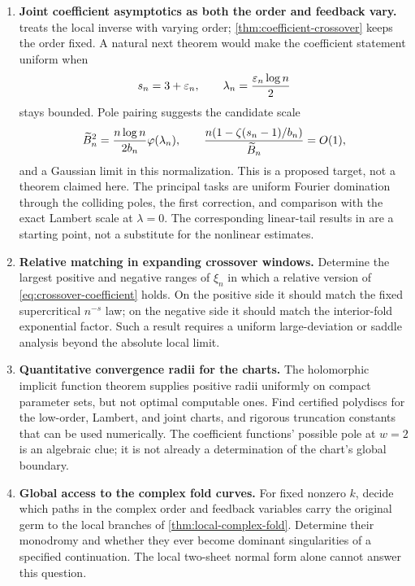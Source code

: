 \begin{enumerate}[label=\textbf{Q\arabic*.},leftmargin=2.7em]
\item \textbf{Joint coefficient asymptotics as both the order and
feedback vary.}
 treats the local inverse with varying
order; \cref{thm:coefficient-crossover} keeps the order fixed.
A natural next theorem would make the coefficient statement uniform
when
\[
 s_n=3+\varepsilon_n,\qquad
 \lambda_n=\frac{\varepsilon_n\log n}{2}
\]
stays bounded.  Pole pairing suggests the candidate scale
\[
 \widetilde B_n^2=\frac{n\log n}{2b_n}\varphi(\lambda_n),
 \qquad
 \frac{n(1-\zeta(s_n-1)/b_n)}{\widetilde B_n}=O(1),
\]
and a Gaussian limit in this normalization.  This is a proposed
target, not a theorem claimed here.  The principal tasks are uniform
Fourier domination through the colliding poles, the first correction,
and comparison with the exact Lambert scale at $\lambda=0$.
The corresponding linear-tail results in \cite{RepoGaussian} are a
starting point, not a substitute for the nonlinear estimates.

\item \textbf{Relative matching in expanding crossover windows.}
Determine the largest positive and negative ranges of $\xi_n$ in
which a relative version of \eqref{eq:crossover-coefficient} holds.
On the positive side it should match the fixed supercritical
$n^{-s}$ law; on the negative side it should match the interior-fold
exponential factor.  Such a result requires a uniform large-deviation
or saddle analysis beyond the absolute local limit.

\item \textbf{Quantitative convergence radii for the charts.}
The holomorphic implicit function theorem supplies positive radii
uniformly on compact parameter sets, but not optimal computable ones.
Find certified polydiscs for the low-order, Lambert, and joint charts,
and rigorous truncation constants that can be used numerically.
The coefficient functions' possible pole at $w=2$ is an algebraic
clue; it is not already a determination of the chart's global boundary.

\item \textbf{Global access to the complex fold curves.}
For fixed nonzero $k$, decide which paths in the complex order and
feedback variables carry the original germ to the local branches of
\cref{thm:local-complex-fold}.  Determine their monodromy and whether
they ever become dominant singularities of a specified continuation.
The local two-sheet normal form alone cannot answer this question.


\end{enumerate}
